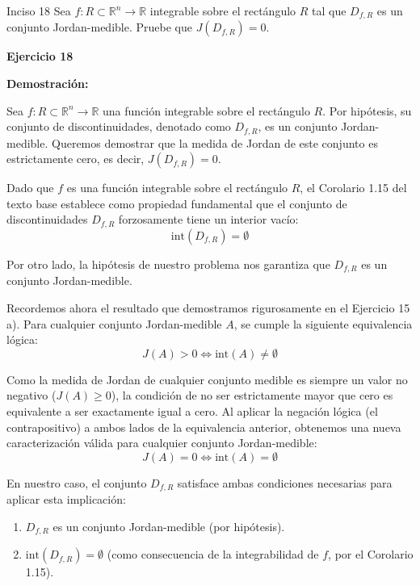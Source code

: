 \documentclass[11pt,letterpaper]{article}
\begin{document}
\begin{inciso}{Inciso 18}
Sea $f:R\subset\mathbb{R}^{n}\rightarrow\mathbb{R}$ integrable sobre el rectángulo $R$ tal que $D_{f,R}$ es un conjunto Jordan-medible. Pruebe que $J(D_{f,R})=0$.
\end{inciso}

\textbf{Ejercicio 18}

\textbf{Demostración:}

Sea $f: R \subset \mathbb{R}^n \rightarrow \mathbb{R}$ una función integrable sobre el rectángulo $R$. Por hipótesis, su conjunto de discontinuidades, denotado como $D_{f,R}$, es un conjunto Jordan-medible. Queremos demostrar que la medida de Jordan de este conjunto es estrictamente cero, es decir, $J(D_{f,R}) = 0$.

Dado que $f$ es una función integrable sobre el rectángulo $R$, el Corolario 1.15 del texto base establece como propiedad fundamental que el conjunto de discontinuidades $D_{f,R}$ forzosamente tiene un interior vacío:
\begin{equation*}
\text{int}(D_{f,R}) = \emptyset
\end{equation*}

Por otro lado, la hipótesis de nuestro problema nos garantiza que $D_{f,R}$ es un conjunto Jordan-medible. 

Recordemos ahora el resultado que demostramos rigurosamente en el Ejercicio 15 a). Para cualquier conjunto Jordan-medible $A$, se cumple la siguiente equivalencia lógica:
\begin{equation*}
J(A) > 0 \iff \text{int}(A) \neq \emptyset
\end{equation*}

Como la medida de Jordan de cualquier conjunto medible es siempre un valor no negativo ($J(A) \ge 0$), la condición de no ser estrictamente mayor que cero es equivalente a ser exactamente igual a cero. Al aplicar la negación lógica (el contrapositivo) a ambos lados de la equivalencia anterior, obtenemos una nueva caracterización válida para cualquier conjunto Jordan-medible:
\begin{equation*}
J(A) = 0 \iff \text{int}(A) = \emptyset
\end{equation*}

En nuestro caso, el conjunto $D_{f,R}$ satisface ambas condiciones necesarias para aplicar esta implicación:
\begin{enumerate}
    \item $D_{f,R}$ es un conjunto Jordan-medible (por hipótesis).
    \item $\text{int}(D_{f,R}) = \emptyset$ (como consecuencia de la integrabilidad de $f$, por el Corolario 1.15).
\end{enumerate}
\end{document}
